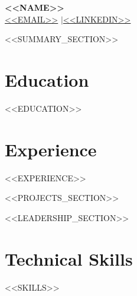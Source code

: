 \documentclass[letterpaper,11pt]{article}
\begin{document}
\begin{center}
  {\LARGE \textbf{<<NAME>>}} \\[4pt]
  \href{mailto:<<EMAIL>>}{<<EMAIL>>} \enspace$|$\enspace \href{https://<<LINKEDIN>>}{<<LINKEDIN>>}
\end{center}

<<SUMMARY_SECTION>>

\section{Education}
<<EDUCATION>>

\section{Experience}
<<EXPERIENCE>>

<<PROJECTS_SECTION>>

<<LEADERSHIP_SECTION>>

\section{Technical Skills}
<<SKILLS>>
\end{document}
